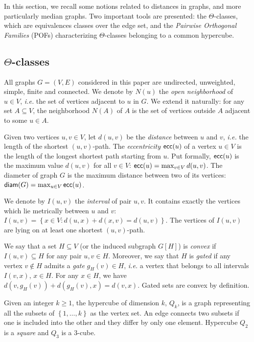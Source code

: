 \documentclass[a4paper,UKenglish,numberwithinsect,cleveref, autoref]{lipics-v2021}
\newcommand{\set}[1]{\left\{ #1 \right\}}
\newcommand{\diam}{\mbox{\textsf{diam}}}
\newcommand{\ecc}{\mbox{\textsf{ecc}}}
\begin{document}
In this section, we recall some notions related to distances in graphs, and more particularly median graphs. Two important tools are presented: the $\Theta$-classes, which are equivalences classes over the edge set, and the \textit{Pairwise Orthogonal Families} (POFs) characterizing $\Theta$-classes belonging to a common hypercube. 

\subsection{$\Theta$-classes} 

All graphs $G = (V,E)$ considered in this paper are undirected, unweighted, simple, finite and connected. We denote by $N(u)$ the \textit{open neighborhood} of $u \in V$, {\em i.e.} the set of vertices adjacent to $u$ in $G$. We extend it naturally: for any set $A \subseteq V$, the neighborhood $N(A)$ of $A$ is the set of vertices outside $A$ adjacent to some $u \in A$.

Given two vertices $u,v \in V$, let $d(u,v)$ be the \textit{distance} between $u$ and $v$, {\em i.e.} the length of the shortest $(u,v)$-path. The \textit{eccentricity} $\ecc(u)$ of a vertex $u \in V$ is the length of the longest shortest path starting from $u$. Put formally, $\ecc(u)$ is the maximum value $d(u,v)$ for all $v \in V$: $\ecc(u) = \max_{v \in V} d(u,v)$. The diameter of graph $G$ is the maximum distance between two of its vertices: $\diam(G) = \max_{u \in V} \ecc(u)$. 

We denote by $I(u,v)$ the \textit{interval} of pair $u,v$. It contains exactly the vertices which lie metrically between $u$ and $v$:
$I(u,v) = \set{x \in V: d(u,x) + d(x,v) = d(u,v)}$. The vertices of $I(u,v)$ are lying on at least one shortest $(u,v)$-path.

We say that a set $H\subseteq V$ (or the induced subgraph $G\left[H\right]$) is \textit{convex} if $I(u,v) \subseteq H$ for any pair $u,v \in H$. Moreover, we say that $H$ is \textit{gated} if any vertex $v \notin H$ admits a \textit{gate} $g_H(v) \in H$, {\em i.e.} a vertex that belongs to all intervals $I(v,x)$, $x\in H$. For any $x \in H$, we have $d(v,g_H(v)) + d(g_H(v),x) = d(v,x)$. Gated sets are convex by definition.

Given an integer $k \ge 1$, the hypercube of dimension $k$, $Q_k$, is a graph representing all the subsets of $\set{1,\ldots,k}$ as the vertex set. An edge connects two subsets if one is included into the other and they differ by only one element. Hypercube $Q_2$ is a \textit{square} and $Q_3$ is a $3$-cube.
\end{document}
